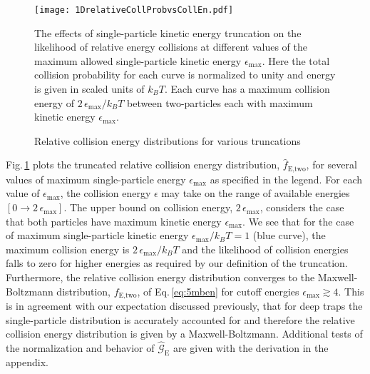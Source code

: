 	\begin{figure} 
	\centerline{
	  \texttt{[image: 1DrelativeCollProbvsCollEn.pdf]}}
	  \caption{Relative collision energy distributions for various truncations}{The effects of single-particle kinetic energy truncation on the likelihood of relative energy collisions at different values of the maximum allowed single-particle kinetic energy $\epsilon_\text{max}$. Here the total collision probability for each curve is normalized to unity and energy is given in scaled units of $k_B T$. Each curve has a maximum collision energy of $2\,\epsilon_\text{max}/k_B T$ between two-particles each with maximum kinetic energy $\epsilon_\text{max}$.}
	  \label{fig:relativeCollProb}
	\end{figure}
Fig.\,\ref{fig:relativeCollProb} plots the truncated relative collision energy distribution, $\hat{f}_\text{E,two}$, for several values of maximum single-particle energy $\epsilon_\text{max}$ as specified in the legend.
For each value of $\epsilon_\text{max}$, the collision energy $\epsilon$ may take on the range of available energies $[ 0 \rightarrow 2\,\epsilon_\text{max} ]$.
The upper bound on collision energy, $2\,\epsilon_\text{max}$, considers the case that both particles have maximum kinetic energy $\epsilon_\text{max}$.
We see that for the case of maximum single-particle kinetic energy $\epsilon_\text{max}/k_B T=1$ (blue curve), the maximum collision energy is $2\,\epsilon_\text{max}/k_B T$ and the likelihood of collision energies falls to zero for higher energies as required by our definition of the truncation.
Furthermore, the relative collision energy distribution converges to the Maxwell-Boltzmann distribution, $f_\text{E,two}$, of Eq.\,\ref{eq:5mben} for cutoff energies $\epsilon_\text{max} \gtrsim 4$.
This is in agreement with our expectation discussed previously, that for deep traps the single-particle distribution is accurately accounted for and therefore the relative collision energy distribution is given by a Maxwell-Boltzmann.
Additional tests of the normalization and behavior of $\hat{\mathcal{G}}_\text{E}$ are given with the derivation in the appendix.


